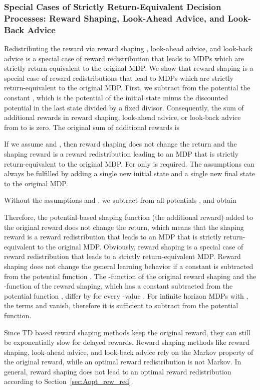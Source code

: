 \documentclass{article}
\begin{document}
\begin{appendices}
\subsubsection{Special Cases of Strictly Return-Equivalent Decision Processes: 
  Reward Shaping, Look-Ahead Advice, and Look-Back Advice}
\label{sec:AshapingEquiv}

Redistributing the reward via
reward shaping \cite{Ng:99,Wiewiora:03}, look-ahead advice, and
look-back advice \cite{Wiewiora:03icml} is 
a special case of reward redistribution that leads to MDPs 
which are strictly return-equivalent to the original MDP.
We show that reward shaping is a special case of
reward redistributions that lead to MDPs 
which are strictly return-equivalent to the original MDP. 
First, we subtract from the potential the constant 
,
which is the potential of the initial state minus the 
discounted potential in the last state divided by a fixed divisor. 
Consequently, the sum of additional rewards in reward shaping, 
look-ahead advice, or look-back advice from  to  is zero.
The original sum of additional rewards is

If we assume  and ,
then reward shaping does not change the return and 
the shaping reward is a reward 
redistribution leading to an MDP that is 
strictly return-equivalent to the original MDP.
For  only
 is required.
The assumptions can always be fulfilled by adding a single new initial
state and a single new final state to the original MDP.

Without the assumptions  and , 
we subtract 
from all
potentials , and obtain

Therefore, the potential-based shaping function (the additional reward)
added to the original reward does not change the return, which means
that the shaping reward is a reward 
redistribution that leads to an MDP that is 
strictly return-equivalent to the original MDP.
Obviously, reward shaping is a special case of reward
redistribution that leads to a strictly 
return-equivalent MDP.
Reward shaping does not change the general learning behavior if a constant 
is subtracted from the potential function . 
The -function of the original reward shaping and the -function of
the reward shaping, which has a constant 
subtracted from the potential function , differ by 
for every -value \cite{Ng:99,Wiewiora:03}.
For infinite horizon MDPs with , 
the terms  and  
vanish, therefore it is sufficient to subtract  from the
potential function.  


Since TD based reward shaping methods keep the original reward, 
they can still be exponentially slow for delayed rewards.
Reward shaping methods like reward shaping, look-ahead advice, and
look-back advice rely on the Markov property of the original reward, 
while an optimal reward redistribution is not Markov.
In general, reward shaping does not lead to 
an optimal reward redistribution according to 
Section~\ref{sec:Aopt_rew_red}.



\end{appendices}
\end{document}
